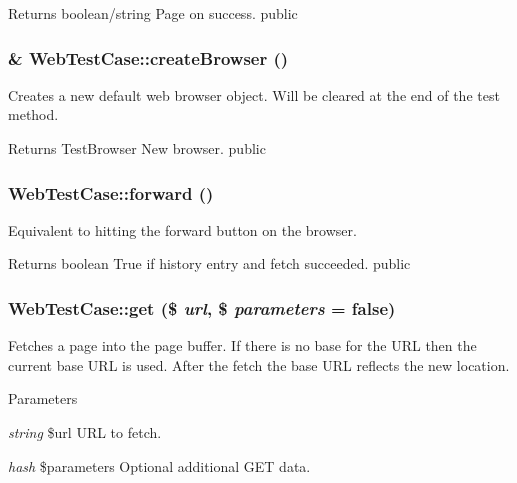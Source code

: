 \begin{DoxyReturn}{Returns}
boolean/string Page on success.  public 
\end{DoxyReturn}
\hypertarget{class_web_test_case_a004842238df312f4fd8d10da0631bbfd}{
\subsubsection[{createBrowser}]{\setlength{\rightskip}{0pt plus 5cm}\& WebTestCase::createBrowser ()}}
\label{class_web_test_case_a004842238df312f4fd8d10da0631bbfd}
Creates a new default web browser object. Will be cleared at the end of the test method. \begin{DoxyReturn}{Returns}
TestBrowser New browser.  public 
\end{DoxyReturn}
\hypertarget{class_web_test_case_a3bcb61ac6efd4894ca22a702859191df}{
\subsubsection[{forward}]{\setlength{\rightskip}{0pt plus 5cm}WebTestCase::forward ()}}
\label{class_web_test_case_a3bcb61ac6efd4894ca22a702859191df}
Equivalent to hitting the forward button on the browser. \begin{DoxyReturn}{Returns}
boolean True if history entry and fetch succeeded.  public 
\end{DoxyReturn}
\hypertarget{class_web_test_case_a754f1efbaf6d5fb23208f2e823d37887}{
\subsubsection[{get}]{\setlength{\rightskip}{0pt plus 5cm}WebTestCase::get (\$ {\em url}, \/  \$ {\em parameters} = {\ttfamily false})}}
\label{class_web_test_case_a754f1efbaf6d5fb23208f2e823d37887}
Fetches a page into the page buffer. If there is no base for the URL then the current base URL is used. After the fetch the base URL reflects the new location. 
\begin{DoxyParams}{Parameters}
\item[{\em string}]\$url URL to fetch. \item[{\em hash}]\$parameters Optional additional GET data. \end{DoxyParams}
